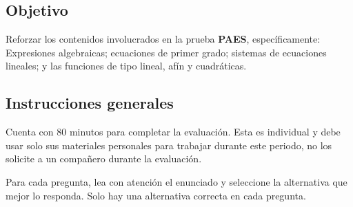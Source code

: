\documentclass[
  titulo=Prueba,
  subtitulo=Álgebra y funciones,
  curso=Tercero medio B,
  fecha=2025-09-26,
  con nombre,
  ppp=1
]{srs3}
\begin{document}
\subsection*{Objetivo}
Reforzar los contenidos involucrados en la prueba \textbf{PAES}, específicamente:
Expresiones algebraicas; ecuaciones de primer grado; sistemas de ecuaciones
lineales; y las funciones de tipo lineal, afín y cuadráticas.
\subsection*{Instrucciones generales}
Cuenta con 80 minutos para completar la evaluación. Esta es individual y debe usar solo sus materiales
personales para trabajar durante este periodo, no los solicite a un compañero durante la evaluación. \par
Para cada pregunta, lea con atención el enunciado y seleccione la
alternativa que mejor lo responda. Solo hay una alternativa
correcta en cada pregunta.
\separador
\end{document}
